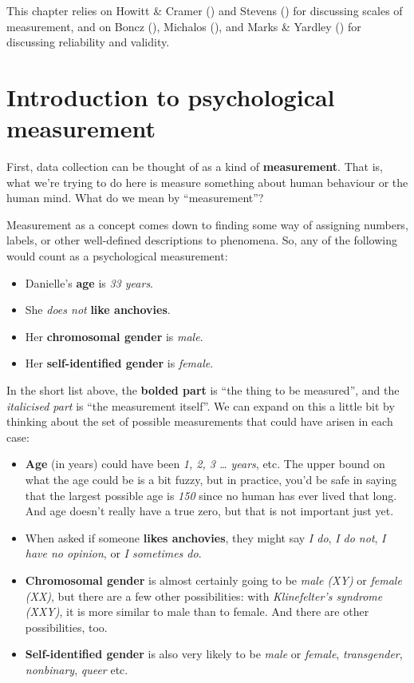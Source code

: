 \documentclass[
  11pt,
  a4paper,
  twoside,symmetric,openright]{book}
\providecommand{\tightlist}{%
  \setlength{\itemsep}{0pt}\setlength{\parskip}{0pt}}
\theoremstyle{break}
\theoremstyle{break}
\begin{document}
This chapter relies on Howitt \& Cramer () and Stevens () for discussing scales of measurement, and on Boncz (), Michalos (), and Marks \& Yardley () for discussing reliability and validity.

\section{Introduction to psychological measurement}\label{measurement}

First, data collection can be thought of as a kind of \textbf{measurement}. That is, what we're trying to do here is measure something about human behaviour or the human mind. What do we mean by ``measurement''?

Measurement as a concept comes down to finding some way of assigning numbers, labels, or other well-defined descriptions to phenomena. So, any of the following would count as a psychological measurement:

\begin{itemize}
\tightlist
\item
  Danielle's \textbf{age} is \emph{33 years}.
\item
  She \emph{does not} \textbf{like anchovies}.
\item
  Her \textbf{chromosomal gender} is \emph{male}.
\item
  Her \textbf{self-identified gender} is \emph{female}.
\end{itemize}

In the short list above, the \textbf{bolded part} is ``the thing to be measured'', and the \emph{italicised part} is ``the measurement itself''. We can expand on this a little bit by thinking about the set of possible measurements that could have arisen in each case:

\begin{itemize}
\tightlist
\item
  \textbf{Age} (in years) could have been \emph{1, 2, 3 \ldots{} years}, etc. The upper bound on what the age could be is a bit fuzzy, but in practice, you'd be safe in saying that the largest possible age is \emph{150} since no human has ever lived that long. And age doesn't really have a true zero, but that is not important just yet.
\item
  When asked if someone \textbf{likes anchovies}, they might say \emph{I do}, \emph{I do not}, \emph{I have no opinion}, or \emph{I sometimes do}.
\item
  \textbf{Chromosomal gender} is almost certainly going to be \emph{male (XY)} or \emph{female (XX)}, but there are a few other possibilities: with \emph{Klinefelter's syndrome (XXY)}, it is more similar to male than to female. And there are other possibilities, too.
\item
  \textbf{Self-identified gender} is also very likely to be \emph{male} or \emph{female}, \emph{transgender}, \emph{nonbinary}, \emph{queer} etc.
\end{itemize}
\end{document}
